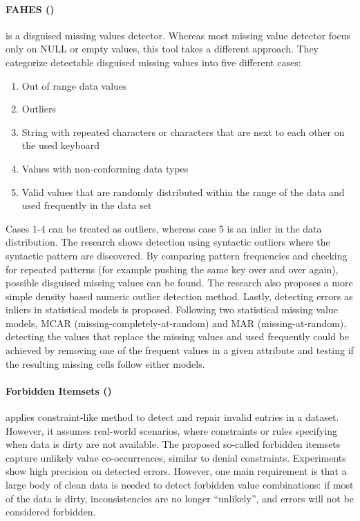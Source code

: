 \paragraph{FAHES (\cite{Qahtan2018-te})} is a disguised missing values detector. Whereas most missing value detector focus only on NULL or empty values, this tool takes a different approach. They categorize detectable disguised missing values into five different cases: 
\begin{enumerate}
    \item Out of range data values
    \item Outliers
    \item String with repeated characters or characters that are next to each other on the used keyboard
    \item Values with non-conforming data types
    \item Valid values that are randomly distributed within the range of the data and used frequently in the data set
\end{enumerate}

Cases 1-4 can be treated as outliers, whereas case 5 is an inlier in the data distribution. 
The research shows detection using syntactic outliers where the syntactic pattern are discovered. By comparing pattern frequencies and checking for repeated patterns (for example pushing the same key over and over again), possible disguised missing values can be found. The research also proposes a more simple density based numeric outlier detection method. Lastly, detecting errors as inliers in statistical models is proposed. Following two statistical missing value models, MCAR (missing-completely-at-random) and MAR (missing-at-random), detecting the values that replace the missing values and used frequently could be achieved by removing one of the frequent values in a given attribute and testing if the resulting missing cells follow either models.

\paragraph{Forbidden Itemsets (\cite{Rammelaere2019-ea})} applies constraint-like method to detect and repair invalid entries in a dataset. However, it assumes real-world scenarios, where constraints or rules specifying when data is dirty are not available. The proposed so-called forbidden itemsets capture unlikely value co-occurrences, similar to denial constraints. Experiments show high precision on detected errors. However, one main requirement is that a large body of clean data is needed to detect forbidden value combinations: if most of the data is dirty, inconsistencies are no longer “unlikely”, and errors will not be considered forbidden. 

